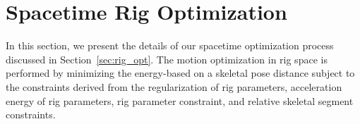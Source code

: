 \section{Spacetime Rig Optimization}
\label{section:spacetime}

In this section, we present the details of our spacetime optimization process discussed in Section~\ref{sec:rig_opt}.
The motion optimization in rig space is performed by minimizing the energy-based on a skeletal pose distance subject to the constraints derived from the regularization of rig parameters, acceleration energy of rig parameters, rig parameter constraint, and relative skeletal segment constraints.



